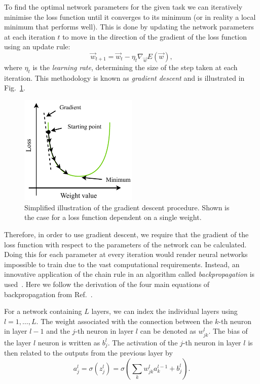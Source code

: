 To find the optimal network parameters for the given task we can iteratively minimise the loss
function until it converges to its minimum (or in reality a local minimum that performs well).
This is done by updating the network parameters at each iteration $t$ to move in the direction of
the gradient of the loss function using an update rule:
\begin{equation} %
    \vec{w}_{t+1}=\vec{w}_{t}-\eta_{t}\nabla_{\vec{w}}E(\vec{w}),
    \label{eq:update_rule}
\end{equation}
where $\eta_{t}$ is the \emph{learning rate}, determining the size of the step taken at each
iteration. This methodology is known as \emph{gradient descent} and is illustrated in
Fig.~\ref{fig:gradient_descent}.

\begin{figure} %
    \includegraphics[width=0.5\textwidth]{diagrams/6-cnn/gradient_descent.pdf}
    \caption[Illustration of the gradient descent process]
    {Simplified illustration of the gradient descent procedure. Shown is the case for a loss
        function dependent on a single weight.}
    \label{fig:gradient_descent}
\end{figure}

Therefore, in order to use gradient descent, we require that the gradient of the loss function
with respect to the parameters of the network can be calculated. Doing this for each parameter at
every iteration would render neural networks impossible to train due to the vast computational
requirements. Instead, an innovative application of the chain rule in an algorithm called
\emph{backpropagation} is used~\cite{werbos1974}. Here we follow the derivation of the four main
equations of backpropagation from Ref.~\cite{mehta2019}.

For a network containing $L$ layers, we can index the individual layers using $l=1,\dots,L$. The
weight associated with the connection between the $k$-th neuron in layer $l-1$ and the $j$-th
neuron in layer $l$ can be denoted as $w^{l}_{jk}$. The bias of the layer $l$ neuron is written as
$b^{l}_{j}$. The activation of the $j$-th neuron in layer $l$ is then related to the outputs from
the previous layer by
\begin{equation} %
    a^{l}_{j}=\sigma(z^{l}_{j})=\sigma\left(\sum_{k}w^{l}_{jk}a^{l-1}_{k}+b^{l}_{j}\right).
    \label{eq:feedforward}
\end{equation}

